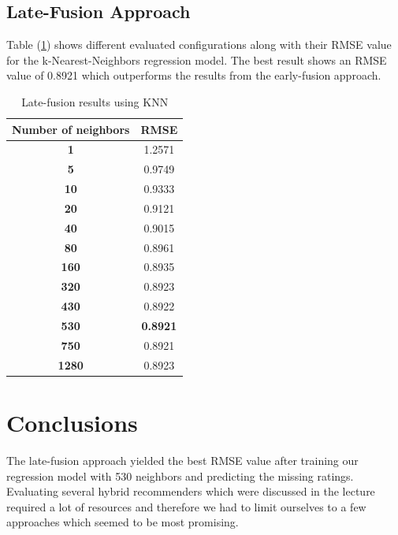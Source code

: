 \documentclass{sigish}
\begin{document}
\subsection{Late-Fusion Approach}
Table (\ref{tab:late_fusion_results}) shows different evaluated configurations along with their RMSE value for the k-Nearest-Neighbors regression model. The best result shows an RMSE value of 0.8921 which outperforms the results from the early-fusion approach.
\begin{table}
	\centering	
	\begin{tabular}{|c|c|}
		\hline
		\textbf{Number of neighbors} & \textbf{RMSE} \\ \hline
		\textbf{1}  & 1.2571         \\ \hline
		\textbf{5} & 0.9749          \\ \hline
		\textbf{10} & 0.9333        \\ \hline
		\textbf{20} & 0.9121         \\ \hline
		\textbf{40} & 0.9015         \\ \hline
		\textbf{80} & 0.8961         \\ \hline
		\textbf{160} & 0.8935         \\ \hline
		\textbf{320} & 0.8923         \\ \hline
		\textbf{430} & 0.8922         \\ \hline
		\textbf{530} & \textbf{0.8921}			\\ \hline
		\textbf{750} & 0.8921         \\ \hline
		\textbf{1280} & 0.8923         \\ \hline
	\end{tabular}
	\caption{Late-fusion results using KNN}
	\label{tab:late_fusion_results}
\end{table}

\section{Conclusions}

The late-fusion approach yielded the best RMSE value after training our regression model with 530 neighbors and predicting the missing ratings. 
Evaluating several hybrid recommenders which were discussed in the lecture required a lot of resources and therefore we had to limit ourselves to a few approaches which seemed to be most promising.



\end{document}
